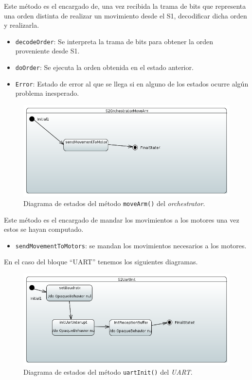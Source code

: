 Este método es el encargado de, una vez recibida la trama de bits que representa una orden distinta de realizar un movimiento desde el S1, decodificar dicha orden y realizarla.

\begin{itemize}
    \item \texttt{decodeOrder}: Se interpreta la trama de bits para obtener la orden proveniente desde S1.
    \item \texttt{doOrder}: Se ejecuta la orden obtenida en el estado anterior.
    \item \texttt{Error}: Estado de error al que se llega si en alguno de los estados ocurre algún problema inesperado. 
\end{itemize}

\begin{figure}[H]
    \centering
    \includegraphics[width=1\linewidth]{pictures/S2OrchestratorMoveArm.PNG}
    \caption{Diagrama de estados del método \texttt{moveArm()} del \textit{orchestrator}.}
    \label{fig:fun_move_arm_orchestator}
\end{figure}

Este método es el encargado de mandar los movimientos a los motores una vez estos se hayan computado.

\begin{itemize}
    \item \texttt{sendMovementToMotors}: se mandan los movimientos necesarios a los motores.
    
\end{itemize}

En el caso del bloque “UART” tenemos los siguientes diagramas.

\begin{figure}[H]
    \centering
    \includegraphics[width=1\linewidth]{pictures/S2UartInit.PNG}
    \caption{Diagrama de estados del método \texttt{uartInit()} del \textit{UART}.}
    \label{fig:fun_uart_init_uart}
\end{figure}

